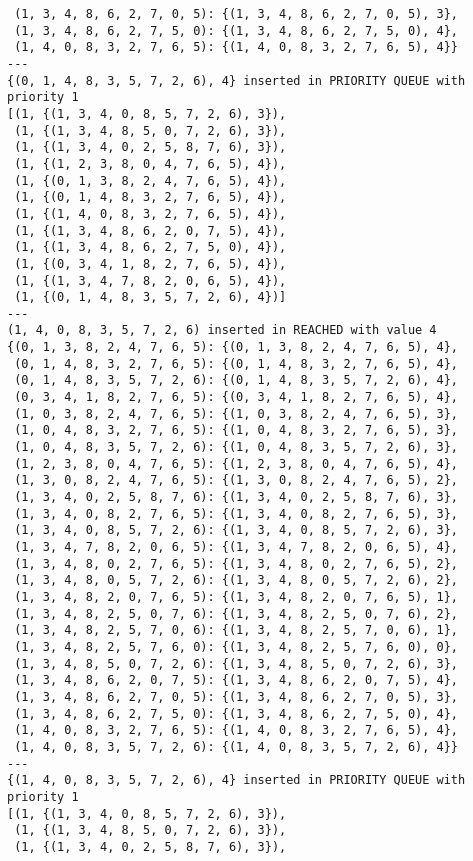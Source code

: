 \documentclass{article}
\begin{document}
\begin{verbatim}
 (1, 3, 4, 8, 6, 2, 7, 0, 5): {(1, 3, 4, 8, 6, 2, 7, 0, 5), 3},
 (1, 3, 4, 8, 6, 2, 7, 5, 0): {(1, 3, 4, 8, 6, 2, 7, 5, 0), 4},
 (1, 4, 0, 8, 3, 2, 7, 6, 5): {(1, 4, 0, 8, 3, 2, 7, 6, 5), 4}}
---
{(0, 1, 4, 8, 3, 5, 7, 2, 6), 4} inserted in PRIORITY QUEUE with priority 1
[(1, {(1, 3, 4, 0, 8, 5, 7, 2, 6), 3}),
 (1, {(1, 3, 4, 8, 5, 0, 7, 2, 6), 3}),
 (1, {(1, 3, 4, 0, 2, 5, 8, 7, 6), 3}),
 (1, {(1, 2, 3, 8, 0, 4, 7, 6, 5), 4}),
 (1, {(0, 1, 3, 8, 2, 4, 7, 6, 5), 4}),
 (1, {(0, 1, 4, 8, 3, 2, 7, 6, 5), 4}),
 (1, {(1, 4, 0, 8, 3, 2, 7, 6, 5), 4}),
 (1, {(1, 3, 4, 8, 6, 2, 0, 7, 5), 4}),
 (1, {(1, 3, 4, 8, 6, 2, 7, 5, 0), 4}),
 (1, {(0, 3, 4, 1, 8, 2, 7, 6, 5), 4}),
 (1, {(1, 3, 4, 7, 8, 2, 0, 6, 5), 4}),
 (1, {(0, 1, 4, 8, 3, 5, 7, 2, 6), 4})]
---
(1, 4, 0, 8, 3, 5, 7, 2, 6) inserted in REACHED with value 4
{(0, 1, 3, 8, 2, 4, 7, 6, 5): {(0, 1, 3, 8, 2, 4, 7, 6, 5), 4},
 (0, 1, 4, 8, 3, 2, 7, 6, 5): {(0, 1, 4, 8, 3, 2, 7, 6, 5), 4},
 (0, 1, 4, 8, 3, 5, 7, 2, 6): {(0, 1, 4, 8, 3, 5, 7, 2, 6), 4},
 (0, 3, 4, 1, 8, 2, 7, 6, 5): {(0, 3, 4, 1, 8, 2, 7, 6, 5), 4},
 (1, 0, 3, 8, 2, 4, 7, 6, 5): {(1, 0, 3, 8, 2, 4, 7, 6, 5), 3},
 (1, 0, 4, 8, 3, 2, 7, 6, 5): {(1, 0, 4, 8, 3, 2, 7, 6, 5), 3},
 (1, 0, 4, 8, 3, 5, 7, 2, 6): {(1, 0, 4, 8, 3, 5, 7, 2, 6), 3},
 (1, 2, 3, 8, 0, 4, 7, 6, 5): {(1, 2, 3, 8, 0, 4, 7, 6, 5), 4},
 (1, 3, 0, 8, 2, 4, 7, 6, 5): {(1, 3, 0, 8, 2, 4, 7, 6, 5), 2},
 (1, 3, 4, 0, 2, 5, 8, 7, 6): {(1, 3, 4, 0, 2, 5, 8, 7, 6), 3},
 (1, 3, 4, 0, 8, 2, 7, 6, 5): {(1, 3, 4, 0, 8, 2, 7, 6, 5), 3},
 (1, 3, 4, 0, 8, 5, 7, 2, 6): {(1, 3, 4, 0, 8, 5, 7, 2, 6), 3},
 (1, 3, 4, 7, 8, 2, 0, 6, 5): {(1, 3, 4, 7, 8, 2, 0, 6, 5), 4},
 (1, 3, 4, 8, 0, 2, 7, 6, 5): {(1, 3, 4, 8, 0, 2, 7, 6, 5), 2},
 (1, 3, 4, 8, 0, 5, 7, 2, 6): {(1, 3, 4, 8, 0, 5, 7, 2, 6), 2},
 (1, 3, 4, 8, 2, 0, 7, 6, 5): {(1, 3, 4, 8, 2, 0, 7, 6, 5), 1},
 (1, 3, 4, 8, 2, 5, 0, 7, 6): {(1, 3, 4, 8, 2, 5, 0, 7, 6), 2},
 (1, 3, 4, 8, 2, 5, 7, 0, 6): {(1, 3, 4, 8, 2, 5, 7, 0, 6), 1},
 (1, 3, 4, 8, 2, 5, 7, 6, 0): {(1, 3, 4, 8, 2, 5, 7, 6, 0), 0},
 (1, 3, 4, 8, 5, 0, 7, 2, 6): {(1, 3, 4, 8, 5, 0, 7, 2, 6), 3},
 (1, 3, 4, 8, 6, 2, 0, 7, 5): {(1, 3, 4, 8, 6, 2, 0, 7, 5), 4},
 (1, 3, 4, 8, 6, 2, 7, 0, 5): {(1, 3, 4, 8, 6, 2, 7, 0, 5), 3},
 (1, 3, 4, 8, 6, 2, 7, 5, 0): {(1, 3, 4, 8, 6, 2, 7, 5, 0), 4},
 (1, 4, 0, 8, 3, 2, 7, 6, 5): {(1, 4, 0, 8, 3, 2, 7, 6, 5), 4},
 (1, 4, 0, 8, 3, 5, 7, 2, 6): {(1, 4, 0, 8, 3, 5, 7, 2, 6), 4}}
---
{(1, 4, 0, 8, 3, 5, 7, 2, 6), 4} inserted in PRIORITY QUEUE with priority 1
[(1, {(1, 3, 4, 0, 8, 5, 7, 2, 6), 3}),
 (1, {(1, 3, 4, 8, 5, 0, 7, 2, 6), 3}),
 (1, {(1, 3, 4, 0, 2, 5, 8, 7, 6), 3}),

\end{verbatim}
\end{document}
